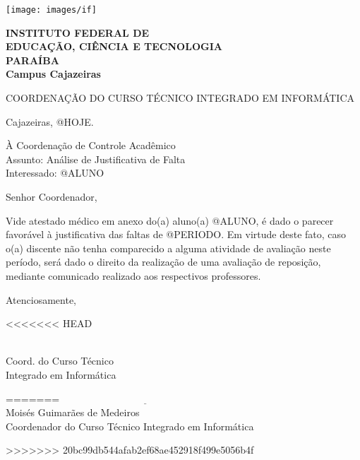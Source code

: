 \documentclass[a4paper, 12pt]{letter}
\begin{document}
\hspace{1.4cm}
\begin{minipage}{.19\textwidth}
    \texttt{[image: images/if]}
\end{minipage}
\begin{minipage}[t]{\textwidth}
        \vspace{.001cm}
        {\bf
            {\selectfont
                INSTITUTO FEDERAL DE\\
                EDUCAÇÃO, CIÊNCIA E TECNOLOGIA\\
                {\color{green}
                    PARAÍBA\\
                    Campus Cajazeiras
                }
            }
        }
\end{minipage}
{\bf
{\selectfont
    \begin{center}
        {\selectfont
            COORDENAÇÃO DO CURSO TÉCNICO INTEGRADO EM INFORMÁTICA
        }
    \end{center}
}

\begin{flushright}
Cajazeiras, @HOJE.
\end{flushright}

\noindent À Coordenação de Controle Acadêmico\\
Assunto: Análise de Justificativa de Falta\\
Interessado: @ALUNO

\noindent Senhor Coordenador,

\onehalfspacing Vide atestado médico em anexo do(a) aluno(a) @ALUNO, é dado o parecer favorável à justificativa das faltas de @PERIODO. Em virtude deste fato, caso o(a) discente não tenha comparecido a alguma atividade de avaliação neste período, será dado o direito da realização de uma avaliação de reposição, mediante comunicado realizado aos respectivos professores.

Atenciosamente,

<<<<<<< HEAD
\begin{flushright}
\\
\indent Coord. do Curso Técnico\\
\indent Integrado em Informática\\
\end{flushright}
=======
\indent $\underline{\hspace{7cm}}$\\
\indent Moisés Guimarães de Medeiros\\
\indent Coordenador do Curso Técnico Integrado em Informática\\
}
>>>>>>> 20bc99db544afab2ef68ae452918f499e5056b4f
\end{document}
